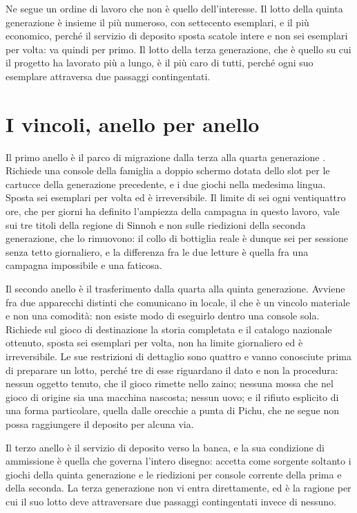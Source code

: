 Ne segue un ordine di lavoro che non è quello dell'interesse. Il lotto della quinta generazione è insieme il più numeroso, con settecento esemplari, e il più economico, perché il servizio di deposito sposta scatole intere e non sei esemplari per volta: va quindi per primo. Il lotto della terza generazione, che è quello su cui il progetto ha lavorato più a lungo, è il più caro di tutti, perché ogni suo esemplare attraversa due passaggi contingentati.

\section{I vincoli, anello per anello}

Il primo anello è il parco di migrazione dalla terza alla quarta generazione \cite{bulbapedia-trasferimenti}. Richiede una console della famiglia a doppio schermo dotata dello slot per le cartucce della generazione precedente, e i due giochi nella medesima lingua. Sposta sei esemplari per volta ed è irreversibile. Il limite di sei ogni ventiquattro ore, che per giorni ha definito l'ampiezza della campagna in questo lavoro, vale sui tre titoli della regione di Sinnoh e non sulle riedizioni della seconda generazione, che lo rimuovono: il collo di bottiglia reale è dunque sei per sessione senza tetto giornaliero, e la differenza fra le due letture è quella fra una campagna impossibile e una faticosa.

Il secondo anello è il trasferimento dalla quarta alla quinta generazione. Avviene fra due apparecchi distinti che comunicano in locale, il che è un vincolo materiale e non una comodità: non esiste modo di eseguirlo dentro una console sola. Richiede sul gioco di destinazione la storia completata e il catalogo nazionale ottenuto, sposta sei esemplari per volta, non ha limite giornaliero ed è irreversibile. Le sue restrizioni di dettaglio sono quattro e vanno conosciute prima di preparare un lotto, perché tre di esse riguardano il dato e non la procedura: nessun oggetto tenuto, che il gioco rimette nello zaino; nessuna mossa che nel gioco di origine sia una macchina nascosta; nessun uovo; e il rifiuto esplicito di una forma particolare, quella dalle orecchie a punta di Pichu, che ne segue non possa raggiungere il deposito per alcuna via.

Il terzo anello è il servizio di deposito verso la banca, e la sua condizione di ammissione è quella che governa l'intero disegno: accetta come sorgente soltanto i giochi della quinta generazione e le riedizioni per console corrente della prima e della seconda. La terza generazione non vi entra direttamente, ed è la ragione per cui il suo lotto deve attraversare due passaggi contingentati invece di nessuno.

